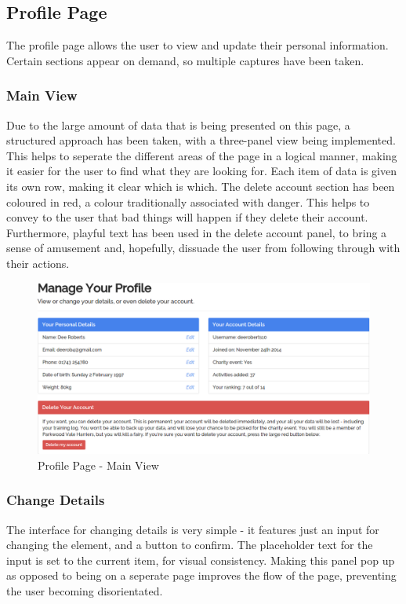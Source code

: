 \documentclass{article}[12pt,a4paper]
\begin{document}
\subsection{Profile Page}
The profile page allows the user to view and update their personal information. Certain sections appear on demand, so multiple captures have been taken.

\subsubsection{Main View}
Due to the large amount of data that is being presented on this page, a structured approach has been taken, with a three-panel view being implemented. This helps to seperate the different areas of the page in a logical manner, making it easier for the user to find what they are looking for. Each item of data is given its own row, making it clear which is which. The delete account section has been coloured in red, a colour traditionally associated with danger. This helps to convey to the user that bad things will happen if they delete their account. Furthermore, playful text has been used in the delete account panel, to bring a sense of amusement and, hopefully, dissuade the user from following through with their actions.

\begin{figure}[h!]
  \includegraphics[scale=0.35]{final_ui/profile}
  \caption{Profile Page - Main View}
\end{figure}
\clearpage

\subsubsection{Change Details}
The interface for changing details is very simple - it features just an input for changing the element, and a button to confirm. The placeholder text for the input is set to the current item, for visual consistency. Making this panel pop up as opposed to being on a seperate page improves the flow of the page, preventing the user becoming disorientated.
\end{document}

